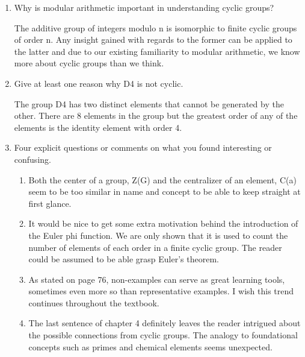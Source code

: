\documentclass{article}
\begin{document}
\begin{enumerate}
    \item Why is modular arithmetic important in understanding cyclic groups?
    \begin{flushleft}
    The additive group of integers modulo n is isomorphic to finite cyclic groups of order n. Any insight gained with regards to the former can be applied to the latter and due to our existing familiarity to modular arithmetic, we know more about cyclic groups than we think.
    \end{flushleft}
    \item Give at least one reason why D4 is not cyclic.
    \begin{flushleft}
    The group D4 has two distinct elements that cannot be generated by the other. There are 8 elements in the group but the greatest order of any of the elements is the identity element with order 4.
    \end{flushleft}
    \item Four explicit questions or comments on what you found interesting or confusing.
        \begin{enumerate}
            \item Both the center of a group, Z(G) and the centralizer of an element, C(a) seem to be too similar in name and concept to be able to keep straight at first glance.
            \item It would be nice to get some extra motivation behind the introduction of the Euler phi function. We are only shown that it is used to count the number of elements of each order in a finite cyclic group. The reader could be assumed to be able grasp Euler's theorem.
            \item As stated on page 76, non-examples can serve as great learning tools, sometimes even more so than representative examples. I wish this trend continues throughout the textbook.
            \item The last sentence of chapter 4 definitely leaves the reader intrigued about the possible connections from cyclic groups. The analogy to foundational concepts such as primes and chemical elements seems unexpected.
        \end{enumerate}
\end{enumerate}
\end{document}
